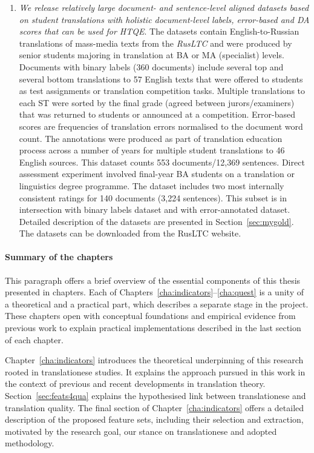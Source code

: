 \begin{enumerate}
	\item \textit{We release relatively large document- and sentence-level aligned datasets based on student translations with holistic document-level labels, error-based and DA scores that can be used for \gls{HTQE}}.
	The datasets contain English-to-Russian translations of mass-media texts from the \textit{RusLTC} and were produced by senior students majoring in translation at BA or MA (specialist) levels. 
	Documents with binary labels (360 documents) include several top and several bottom translations to 57 English texts that were offered to students as test assignments or translation competition tasks. Multiple translations to each ST were sorted by the final grade (agreed between jurors/examiners) that was returned to students or announced at a competition.
	Error-based scores are frequencies of translation errors normalised to the document word count. The annotations were produced as part of translation education process across a number of years for multiple student translations to 46 English sources. This dataset counts 553 documents/12,369 sentences.
	Direct assessment experiment involved final-year BA students on a translation or linguistics degree programme. The dataset includes two most internally consistent ratings for 140 documents (3,224 sentences). This subset is in intersection with binary labels dataset and with error-annotated dataset.
	Detailed description of the datasets are presented in Section~\ref{sec:mygold}. The datasets can be downloaded from the RusLTC website.
	
\end{enumerate}
\paragraph{Summary of the chapters}
This paragraph offers a brief overview of the essential components of this thesis presented in chapters.
Each of Chapters~\ref{cha:indicators}--\ref{cha:quest} is a unity of a theoretical and a practical part, which describes a separate stage in the project. These chapters open with conceptual foundations and empirical evidence from previous work to explain practical implementations described in the last section of each chapter. 

Chapter~\ref{cha:indicators} introduces the theoretical underpinning of this research rooted in translationese studies. It explains the approach pursued in this work in the context of previous and recent developments in translation theory.
Section~\ref{sec:feats4qua} explains the hypothesised link between translationese and translation quality. The final section of Chapter~\ref{cha:indicators} offers a detailed description of the proposed feature sets, including their selection and extraction, motivated by the research goal, our stance on translationese and adopted methodology.

